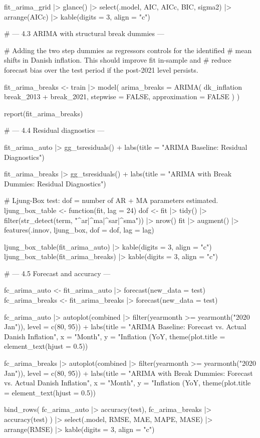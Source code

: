 fit_arima_grid |>
  glance() |>
  select(.model, AIC, AICc, BIC, sigma2) |>
  arrange(AICc) |>
  kable(digits = 3, align = "c")


# --- 4.3 ARIMA with structural break dummies ---

# Adding the two step dummies as regressors controls for the identified
# mean shifts in Danish inflation. This should improve fit in-sample and
# reduce forecast bias over the test period if the post-2021 level persists.

fit_arima_breaks <- train |>
  model(
    arima_breaks = ARIMA(
      dk_inflation ~ break_2013 + break_2021,
      stepwise      = FALSE,
      approximation = FALSE
    )
  )

report(fit_arima_breaks)


# --- 4.4 Residual diagnostics ---

fit_arima_auto |>
  gg_tsresiduals() +
  labs(title = "ARIMA Baseline: Residual Diagnostics")

fit_arima_breaks |>
  gg_tsresiduals() +
  labs(title = "ARIMA with Break Dummies: Residual Diagnostics")

# Ljung-Box test: dof = number of AR + MA parameters estimated.
ljung_box_table <- function(fit, lag = 24) {
  dof <- fit |> tidy() |>
    filter(str_detect(term, "^ar|^ma|^sar|^sma")) |>
    nrow()
  fit |>
    augment() |>
    features(.innov, ljung_box, dof = dof, lag = lag)
}

ljung_box_table(fit_arima_auto)   |> kable(digits = 3, align = "c")
ljung_box_table(fit_arima_breaks) |> kable(digits = 3, align = "c")


# --- 4.5 Forecast and accuracy ---

fc_arima_auto   <- fit_arima_auto   |> forecast(new_data = test)
fc_arima_breaks <- fit_arima_breaks |> forecast(new_data = test)

fc_arima_auto |>
  autoplot(combined |> filter(yearmonth >= yearmonth("2020 Jan")), level = c(80, 95)) +
  labs(title = "ARIMA Baseline: Forecast vs. Actual Danish Inflation",
       x = "Month", y = "Inflation (YoY, %
  theme(plot.title = element_text(hjust = 0.5))

fc_arima_breaks |>
  autoplot(combined |> filter(yearmonth >= yearmonth("2020 Jan")), level = c(80, 95)) +
  labs(title = "ARIMA with Break Dummies: Forecast vs. Actual Danish Inflation",
       x = "Month", y = "Inflation (YoY, %
  theme(plot.title = element_text(hjust = 0.5))

bind_rows(
  fc_arima_auto   |> accuracy(test),
  fc_arima_breaks |> accuracy(test)
) |>
  select(.model, RMSE, MAE, MAPE, MASE) |>
  arrange(RMSE) |>
  kable(digits = 3, align = "c")


